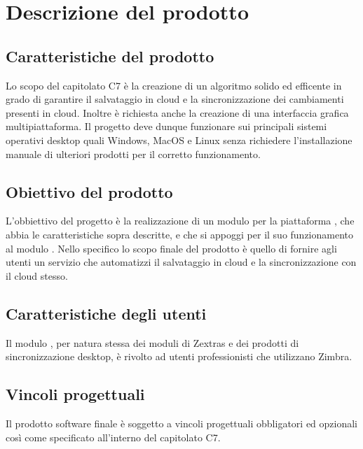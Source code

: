 \section{Descrizione del prodotto}
\subsection{Caratteristiche del prodotto}
Lo scopo del capitolato C7 è la creazione di un algoritmo solido ed efficente in grado di garantire il salvataggio in cloud e la sincronizzazione dei cambiamenti presenti in cloud. Inoltre è richiesta anche la creazione di una interfaccia grafica multipiattaforma. Il progetto deve dunque funzionare sui principali sistemi operativi desktop quali Windows, MacOS e Linux senza richiedere l'installazione manuale di ulteriori prodotti per il corretto funzionamento. 
\subsection{Obiettivo del prodotto}
L'obbiettivo del progetto è la realizzazione di un modulo per la piattaforma , che abbia le caratteristiche sopra descritte, e che si appoggi per il suo funzionamento al modulo .
Nello specifico lo scopo finale del prodotto è quello di fornire agli utenti un servizio che automatizzi il salvataggio in cloud e la sincronizzazione con il cloud stesso.
\subsection{Caratteristiche degli utenti}
Il modulo \progetto{}, per natura stessa dei moduli di Zextras e dei prodotti di sincronizzazione desktop, è rivolto ad utenti professionisti che utilizzano Zimbra. 
\subsection{Vincoli progettuali}
Il prodotto software finale è soggetto a vincoli progettuali obbligatori ed opzionali così come specificato all'interno del capitolato C7.